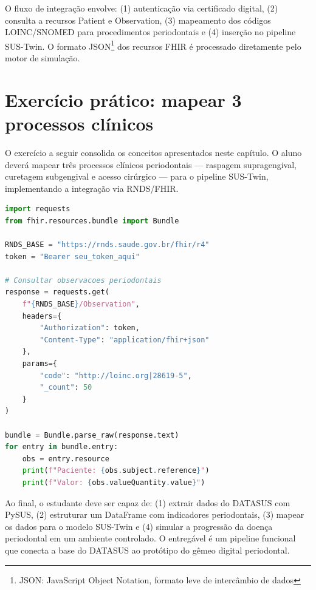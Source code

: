 O fluxo de integração envolve: (1) autenticação via certificado digital, (2) consulta a recursos Patient e Observation, (3) mapeamento dos códigos LOINC/SNOMED para procedimentos periodontais e (4) inserção no pipeline SUS-Twin. O formato JSON{\footnote{JSON: JavaScript Object Notation, formato leve de intercâmbio de dados}} dos recursos FHIR é processado diretamente pelo motor de simulação.

\section{Exercício prático: mapear 3 processos clínicos}

O exercício a seguir consolida os conceitos apresentados neste capítulo. O aluno deverá mapear três processos clínicos periodontais --- raspagem supragengival, curetagem subgengival e acesso cirúrgico --- para o pipeline SUS-Twin, implementando a integração via RNDS/FHIR.

\begin{lstlisting}[language=Python,caption={Integração FHIR/RNDS para dados periodontais}]
import requests
from fhir.resources.bundle import Bundle

RNDS_BASE = "https://rnds.saude.gov.br/fhir/r4"
token = "Bearer seu_token_aqui"

# Consultar observacoes periodontais
response = requests.get(
    f"{RNDS_BASE}/Observation",
    headers={
        "Authorization": token,
        "Content-Type": "application/fhir+json"
    },
    params={
        "code": "http://loinc.org|28619-5",
        "_count": 50
    }
)

bundle = Bundle.parse_raw(response.text)
for entry in bundle.entry:
    obs = entry.resource
    print(f"Paciente: {obs.subject.reference}")
    print(f"Valor: {obs.valueQuantity.value}")
\end{lstlisting}

Ao final, o estudante deve ser capaz de: (1) extrair dados do DATASUS com PySUS, (2) estruturar um DataFrame com indicadores periodontais, (3) mapear os dados para o modelo SUS-Twin e (4) simular a progressão da doença periodontal em um ambiente controlado. O entregável é um pipeline funcional que conecta a base do DATASUS ao protótipo do gêmeo digital periodontal.
